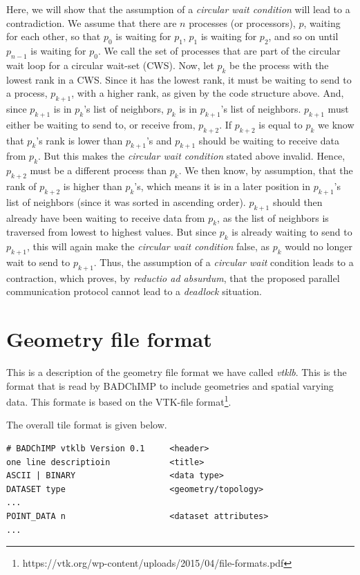 \documentclass[11pt,a4paper]{report}
\begin{document}
Here, we will show that the assumption of a \emph{circular wait condition} will lead to a contradiction. We assume that there are $n$ processes (or processors), $p$, waiting for each other, so that $p_0$ is waiting for $p_1$, $p_1$ is waiting for $p_2$, and so on until $p_{n-1}$ is waiting for $p_0$. We call the set of processes that are part of the circular wait loop for a circular wait-set (CWS). Now, let $p_k$ be the process with the lowest rank in a CWS. Since it has the lowest rank, it must be waiting to send to a process, $p_{k+1}$, with a higher rank, as given by the code structure above. And, since $p_{k+1}$ is in $p_k$'s list of neighbors, $p_k$ is in $p_{k+1}$'s list of neighbors. $p_{k+1}$ must either be waiting to send to, or receive from, $p_{k+2}$. If $p_{k+2}$ is equal to $p_k$ we know that $p_k$'s rank is lower than $p_{k+1}$'s and $p_{k+1}$ should be waiting to receive data from $p_k$. But this makes the \emph{circular wait condition} stated above invalid. Hence, $p_{k+2}$ must be a different process than $p_k$. We then know, by assumption, that the rank of $p_{k+2}$ is higher than $p_k$'s, which means it is in a later position in $p_{k+1}$'s list of neighbors (since it was sorted in ascending order). $p_{k+1}$ should then already have been waiting to receive data from $p_k$, as the list of neighbors is traversed from lowest to highest values. But since $p_k$ is already waiting to send to $p_{k+1}$, this will again make the \emph{circular wait condition} false, as $p_k$ would no longer wait to send to $p_{k+1}$. Thus, the assumption of a \emph{circular wait} condition leads to a contraction, which proves, by \emph{reductio ad absurdum}, that the proposed parallel communication protocol cannot lead to a \emph{deadlock} situation.

\chapter{Geometry file format}\label{sec:geometry file format}
This is a description of the geometry file format we have called \emph{vtklb}. This is the format that is read by BADChIMP to include geometries and spatial varying data. This formate is based on the VTK-file format\footnote{https://vtk.org/wp-content/uploads/2015/04/file-formats.pdf}.

The overall tile format is given below.
\begin{verbatim}
# BADChIMP vtklb Version 0.1     <header>
one line descriptioin            <title> 
ASCII | BINARY                   <data type>
DATASET type                     <geometry/topology>
...
POINT_DATA n                     <dataset attributes>
...
\end{verbatim}
\end{document}
